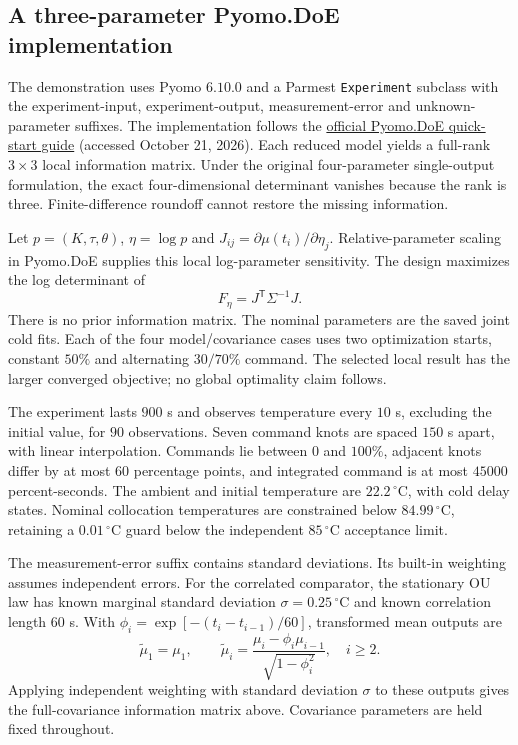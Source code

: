 \documentclass[11pt]{article}
\begin{document}
\subsection{A three-parameter Pyomo.DoE implementation}
The demonstration uses Pyomo $6.10.0$ and a Parmest \texttt{Experiment} subclass
with the experiment-input, experiment-output, measurement-error and
unknown-parameter suffixes. The implementation follows the
\href{https://pyomo.readthedocs.io/en/stable/explanation/analysis/doe/guide.html}{official Pyomo.DoE quick-start guide}
(accessed October 21, 2026). Each reduced model yields a full-rank $3\times3$
local information matrix. Under the original four-parameter single-output
formulation, the exact four-dimensional determinant vanishes because the rank
is three. Finite-difference roundoff cannot restore the missing information.

Let $p=(K,\tau,\theta)$, $\eta=\log p$ and
$J_{ij}=\partial\mu(t_i)/\partial\eta_j$. Relative-parameter scaling in
Pyomo.DoE supplies this local log-parameter sensitivity. The design maximizes
the log determinant of
\begin{equation}
 F_\eta=J^\mathsf{T}\Sigma^{-1}J.
\end{equation}
There is no prior information matrix. The nominal parameters are the saved joint
cold fits. Each of the four model/covariance cases uses two optimization starts,
constant $50\%$ and alternating $30/70\%$ command. The selected local result
has the larger converged objective; no global optimality claim follows.

The experiment lasts $900$ s and observes temperature every $10$ s, excluding
the initial value, for $90$ observations. Seven command knots are spaced
$150$ s apart, with linear interpolation. Commands lie between $0$ and $100\%$,
adjacent knots differ by at most $60$ percentage points, and integrated command
is at most $45000$ percent-seconds. The ambient and initial temperature are
$22.2\,{}^\circ\mathrm C$, with cold delay states. Nominal collocation
temperatures are constrained below $84.99\,{}^\circ\mathrm C$, retaining a
$0.01\,{}^\circ\mathrm C$ guard below the independent $85\,{}^\circ\mathrm C$
acceptance limit.

The measurement-error suffix contains standard deviations. Its built-in
weighting assumes independent errors. For the correlated comparator, the
stationary OU law has known marginal standard deviation
$\sigma=0.25\,{}^\circ\mathrm C$ and known correlation length $60$ s.
With $\phi_i=\exp[-(t_i-t_{i-1})/60]$, transformed mean outputs are
\begin{equation}
 \widetilde\mu_1=\mu_1,\qquad
 \widetilde\mu_i=\frac{\mu_i-\phi_i\mu_{i-1}}{\sqrt{1-\phi_i^2}},
 \quad i\geq2.
\end{equation}
Applying independent weighting with standard deviation $\sigma$ to these
outputs gives the full-covariance information matrix above. Covariance
parameters are held fixed throughout.
\end{document}
